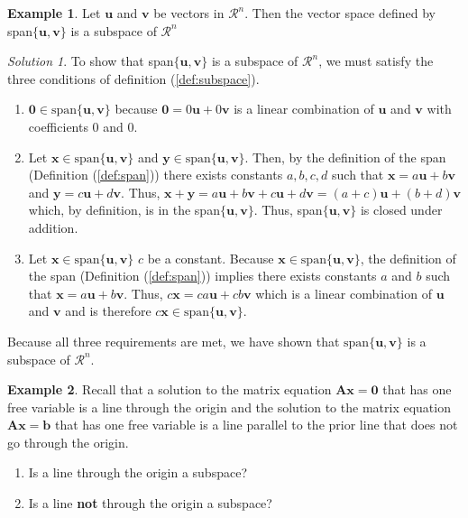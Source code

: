 \documentclass[
]{book}
\theoremstyle{definition}
\theoremstyle{definition}
\newtheorem{example}{Example}[chapter]
\theoremstyle{definition}
\theoremstyle{definition}
\theoremstyle{remark}
\newtheorem*{solution}{Solution}
\begin{document}
\begin{example}
Let \(\mathbf{u}\) and \(\mathbf{v}\) be vectors in \(\mathcal{R}^n\). Then the vector space defined by span\(\{\mathbf{u}, \mathbf{v} \}\) is a subspace of \(\mathcal{R}^n\)
\end{example}

\begin{solution}
To show that span\(\{\mathbf{u}, \mathbf{v}\}\) is a subspace of \(\mathcal{R}^n\), we must satisfy the three conditions of definition (\ref{def:subspace}).

\begin{enumerate}
\def\labelenumi{\arabic{enumi})}
\item
  \(\mathbf{0} \in \mbox{span}\{\mathbf{u}, \mathbf{v}\}\) because \(\mathbf{0} = 0 \mathbf{u} + 0 \mathbf{v}\) is a linear combination of \(\mathbf{u}\) and \(\mathbf{v}\) with coefficients 0 and 0.
\item
  Let \(\mathbf{x} \in \mbox{span}\{\mathbf{u}, \mathbf{v}\}\) and \(\mathbf{y} \in \mbox{span}\{\mathbf{u}, \mathbf{v}\}\). Then, by the definition of the span (Definition (\ref{def:span})) there exists constants \(a, b, c, d\) such that \(\mathbf{x} = a \mathbf{u} + b \mathbf{v}\) and \(\mathbf{y} = c \mathbf{u} + d \mathbf{v}\). Thus, \(\mathbf{x} + \mathbf{y} = a \mathbf{u} + b \mathbf{v} + c \mathbf{u} + d \mathbf{v} = (a + c) \mathbf{u} + (b + d) \mathbf{v}\) which, by definition, is in the span\(\{\mathbf{u}, \mathbf{v}\}\). Thus, span\(\{\mathbf{u}, \mathbf{v}\}\) is closed under addition.
\item
  Let \(\mathbf{x} \in \mbox{span}\{\mathbf{u}, \mathbf{v}\}\) \(c\) be a constant. Because \(\mathbf{x} \in \mbox{span}\{\mathbf{u}, \mathbf{v}\}\), the definition of the span (Definition (\ref{def:span})) implies there exists constants \(a\) and \(b\) such that \(\mathbf{x} = a \mathbf{u} + b \mathbf{v}\). Thus, \(c\mathbf{x} = ca \mathbf{u} + cb \mathbf{v}\) which is a linear combination of \(\mathbf{u}\) and \(\mathbf{v}\) and is therefore \(c\mathbf{x} \in \mbox{span}\{\mathbf{u}, \mathbf{v}\}\).
\end{enumerate}

Because all three requirements are met, we have shown that \(\mbox{span}\{\mathbf{u}, \mathbf{v}\}\) is a subspace of \(\mathcal{R}^n\).
\end{solution}

\begin{example}

Recall that a solution to the matrix equation \(\mathbf{A} \mathbf{x} = \mathbf{0}\) that has one free variable is a line through the origin and the solution to the matrix equation \(\mathbf{A} \mathbf{x} = \mathbf{b}\) that has one free variable is a line parallel to the prior line that does not go through the origin.

\begin{enumerate}
\def\labelenumi{\Alph{enumi})}
\item
  Is a line through the origin a subspace?
\item
  Is a line \textbf{not} through the origin a subspace?
\end{enumerate}

\end{example}
\end{document}
